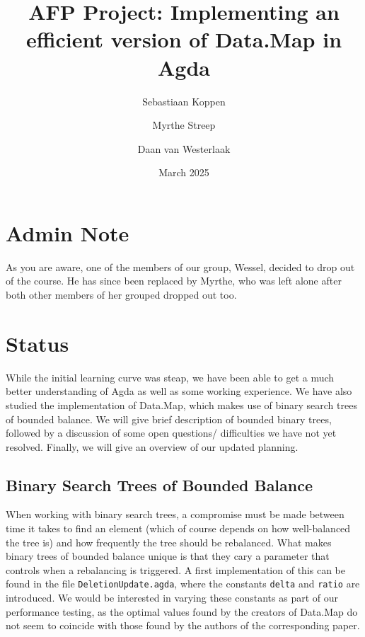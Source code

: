 \documentclass[a4paper,UKenglish,cleveref, autoref, thm-restate]{template/lipics-v2021}
\title{AFP Project: Implementing an efficient version of Data.Map in Agda}
\author{Sebastiaan Koppen}{Utrecht University, Netherlands}{}{}{}
\author{Myrthe Streep}{Utrecht University, Netherlands}{}{}{}
\author{Daan van Westerlaak}{Utrecht University, Netherlands}{}{}{}
\date{March 2025}
\begin{document}
\maketitle



\section*{Admin Note}
As you are aware, one of the members of our group, Wessel, decided to drop out of the course. He has since been replaced by Myrthe, who was left alone after both other members of her grouped dropped out too.

\section*{Status}
While the initial learning curve was steap, we have been able to get a much better understanding of Agda as well as some working experience. We have also studied the implementation of Data.Map, which makes use of binary search trees of bounded balance. We will give brief description of bounded binary trees, followed by a discussion of some open questions/ difficulties we have not yet resolved. Finally, we will give an overview of our updated planning.

\subsection*{Binary Search Trees of Bounded Balance}
When working with binary search trees, a compromise must be made between time it takes to find an element (which of course depends on how well-balanced the tree is) and how frequently the tree should be rebalanced. What makes binary trees of bounded balance unique is that they cary a parameter that controls when a rebalancing is triggered. A first implementation of this can be found in the file \texttt{DeletionUpdate.agda}, where the constants \texttt{delta} and \texttt{ratio} are introduced. We would be interested in varying these constants as part of our performance testing, as the optimal values found by the creators of Data.Map do not seem to coincide with those found by the authors of the corresponding paper.
\end{document}

